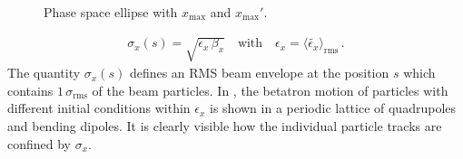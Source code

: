 \begin{figure}[t]  
  \centering
{}
  \caption{Phase space ellipse with $x_\text{max}$ and $x_\text{max}'$.}
  \label{pic:ell}
  \end{figure}
%
%
%
\begin{align}
  \sigma_x (s) = \sqrt{\epsilon_x \, \beta_x} \quad \text{with} \quad \epsilon_x = \langle \tilde{\epsilon_x} \rangle_{\text{rms}} \, .
\end{align}
%
The quantity $\sigma_x(s)$ defines an RMS beam envelope at the position $s$ which contains $1 \, \sigma_\text{rms}$ of the beam particles. In , the betatron motion of particles with different initial conditions within $\epsilon_x$ is shown in a periodic lattice of quadrupoles and bending dipoles. It is clearly visible how the individual particle tracks are confined by $\sigma_x$.
%

